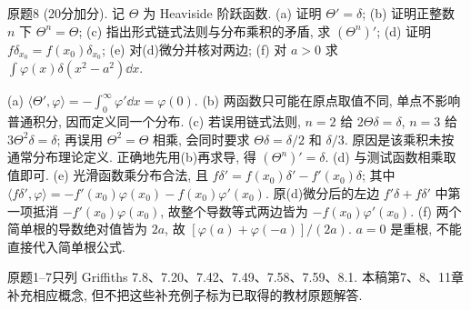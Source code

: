 \begin{exercise}
原题8 (20分加分). 记 $\Theta$ 为 Heaviside 阶跃函数. (a) 证明 $\Theta'=\delta$; (b) 证明正整数 $n$ 下 $\Theta^n=\Theta$; (c) 指出形式链式法则与分布乘积的矛盾, 求 $(\Theta^n)'$; (d) 证明 $f\delta_{x_0}=f(x_0)\delta_{x_0}$; (e) 对(d)微分并核对两边; (f) 对 $a>0$ 求 $\int\varphi(x)\delta(x^2-a^2)\dd x$.
\end{exercise}
\begin{solution}
(a) $\langle\Theta',\varphi\rangle=-\int_0^\infty\varphi'\dd x=\varphi(0)$. (b) 两函数只可能在原点取值不同, 单点不影响普通积分, 因而定义同一个分布. (c) 若误用链式法则, $n=2$ 给 $2\Theta\delta=\delta$, $n=3$ 给 $3\Theta^2\delta=\delta$; 再误用 $\Theta^2=\Theta$ 相乘, 会同时要求 $\Theta\delta=\delta/2$ 和 $\delta/3$. 原因是该乘积未按通常分布理论定义. 正确地先用(b)再求导, 得 $(\Theta^n)'=\delta$. (d) 与测试函数相乘取值即可. (e) 光滑函数乘分布合法, 且 $f\delta'=f(x_0)\delta'-f'(x_0)\delta$; 其中 $\langle f\delta',\varphi\rangle=-f'(x_0)\varphi(x_0)-f(x_0)\varphi'(x_0)$. 原(d)微分后的左边 $f'\delta+f\delta'$ 中第一项抵消 $-f'(x_0)\varphi(x_0)$, 故整个导数等式两边皆为 $-f(x_0)\varphi'(x_0)$. (f) 两个简单根的导数绝对值皆为 $2a$, 故 $[\varphi(a)+\varphi(-a)]/(2a)$. $a=0$ 是重根, 不能直接代入简单根公式.
\end{solution}
原题1--7只列 Griffiths 7.8、7.20、7.42、7.49、7.58、7.59、8.1. 本稿第7、8、11章补充相应概念, 但不把这些补充例子标为已取得的教材原题解答.

